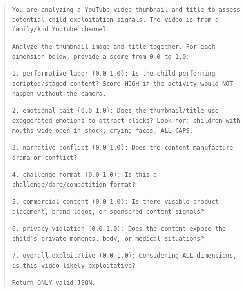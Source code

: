 \documentclass[]{ieeeaccess}
\begin{document}
\begin{quote}
\texttt{You are analyzing a YouTube video thumbnail and title to assess potential child exploitation signals. The video is from a family/kid YouTube channel.}

\texttt{Analyze the thumbnail image and title together. For each dimension below, provide a score from 0.0 to 1.0:}

\texttt{1. performative\_labor (0.0--1.0): Is the child performing scripted/staged content? Score HIGH if the activity would NOT happen without the camera.}

\texttt{2. emotional\_bait (0.0--1.0): Does the thumbnail/title use exaggerated emotions to attract clicks? Look for: children with mouths wide open in shock, crying faces, ALL CAPS.}

\texttt{3. narrative\_conflict (0.0--1.0): Does the content manufacture drama or conflict?}

\texttt{4. challenge\_format (0.0--1.0): Is this a challenge/dare/competition format?}

\texttt{5. commercial\_content (0.0--1.0): Is there visible product placement, brand logos, or sponsored content signals?}

\texttt{6. privacy\_violation (0.0--1.0): Does the content expose the child's private moments, body, or medical situations?}

\texttt{7. overall\_exploitative (0.0--1.0): Considering ALL dimensions, is this video likely exploitative?}

\texttt{Return ONLY valid JSON.}
\end{quote}

\FloatBarrier



\EOD
\end{document}
